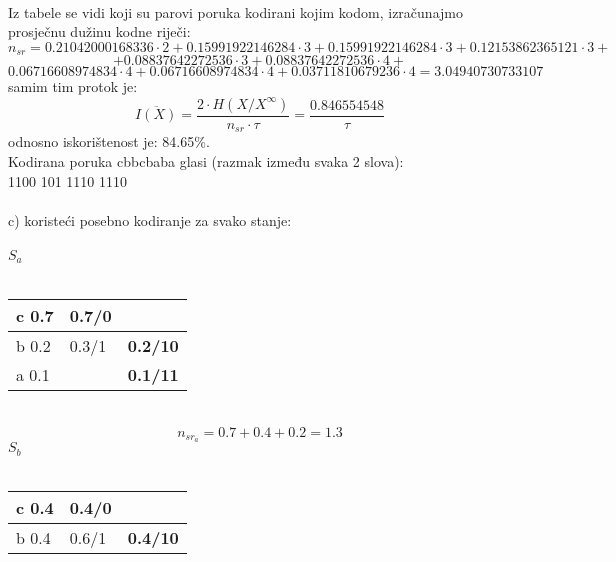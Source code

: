 \documentclass[12pt]{article}
\begin{document}
\begin{enumerate}
\begin{tabular}{|l|l|l|ll}
\end{tabular}
\\
\newpage
Iz tabele se vidi koji su parovi poruka kodirani kojim kodom, izračunajmo
prosječnu dužinu kodne riječi:
\begin{equation*}
    n_{sr} = 0.21042000168336 \cdot 2  +
0.15991922146284  \cdot 3 +
0.15991922146284      \cdot 3 +
0.12153862365121  \cdot 3 +
\end{equation*}
\begin{equation*}
    + 0.08837642272536     \cdot 3 + 0.08837642272536   \cdot 4 +
\end{equation*}
\begin{equation*}
0.06716608974834      \cdot 4 +
0.06716608974834      \cdot 4 +
0.03711810679236      \cdot 4 = 3.04940730733107
\end{equation*}
samim tim protok je: 
\begin{equation*}
    \overline{I(X)} = \frac{2 \cdot H(X/X^\infty)}{n_{sr} \cdot \tau} = \frac{0.846554548}{\tau}
\end{equation*}
odnosno iskorištenost je: 84.65\%. \\
Kodirana poruka cbbcbaba glasi (razmak između svaka 2 slova): \\
1100 101 1110 1110
\\
\\
c) koristeći posebno kodiranje za svako stanje:
\\
\\
$S_a$ \\
\\
\begin{tabular}{|l|l|l}
\cline{1-2}
c 0.7 & \textbf{0.7/0} &                                      \\ \hline
b 0.2 & 0.3/1          & \multicolumn{1}{l|}{\textbf{0.2/10}} \\ \cline{1-1} \cline{3-3} 
a 0.1 &                & \multicolumn{1}{l|}{\textbf{0.1/11}} \\ \hline
\end{tabular}
\\
\begin{equation*}
    n_{sr_{a}} = 0.7 + 0.4 + 0.2 = 1.3
\end{equation*}
 $S_b$ \\
\\
\begin{tabular}{|l|l|l}
\cline{1-2}
c 0.4 & \textbf{0.4/0} &                                      \\ \hline
b 0.4 & 0.6/1          & \multicolumn{1}{l|}{\textbf{0.4/10}} \\ \cline{1-1} \cline{3-3} 

\end{tabular}
\end{enumerate}
\end{document}
